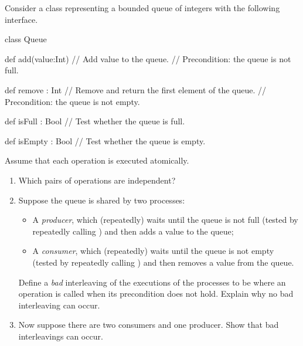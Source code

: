 \begin{question}
Consider a class representing a bounded queue of integers with the following
interface. 
%
\begin{scala}
class Queue{
  def add(value:Int) 
  // Add value to the queue.  
  // Precondition: the queue is not full.

  def remove : Int
  // Remove and return the first element of the queue.
  // Precondition: the queue is not empty.

  def isFull : Bool
  // Test whether the queue is full.

  def isEmpty : Bool
  // Test whether the queue is empty.
}
\end{scala}
%
Assume that each operation is executed atomically.

\begin{enumerate}
\item
Which pairs of operations are independent?

\item
Suppose the queue is shared by two processes:
\begin{itemize}
\item
A \emph{producer}, which (repeatedly) waits until the queue is not full
(tested by repeatedly calling ) and then adds a value to the
queue; 

\item
A \emph{consumer}, which (repeatedly) waits until the queue is not empty
(tested by repeatedly calling ) and then removes a value from
the queue.
\end{itemize}
%
Define a \emph{bad} interleaving of the executions of the processes to be
where an operation is called when its precondition does not hold.  Explain why
no bad interleaving can occur.

\item
Now suppose there are two consumers and one producer.  Show that bad
interleavings can occur.
\end{enumerate}


\end{question}


